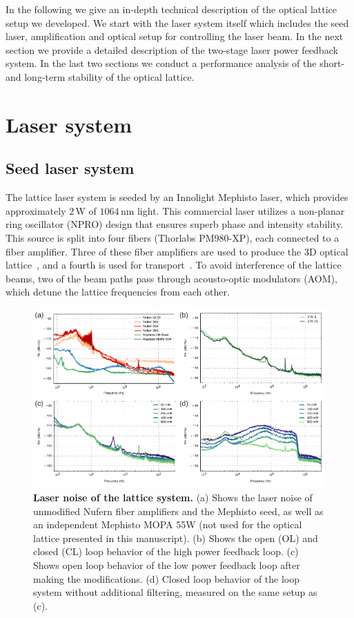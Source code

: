 \documentclass[twocolumn,aps,pra,showpacs,preprintnumbers,bibnotes]{revtex4-1}
\begin{document}
In the following we give an in-depth technical description of the optical lattice setup we developed. We start with the laser system itself which includes the seed laser, amplification and optical setup for controlling the laser beam. In the next section we provide a detailed description of the two-stage laser power feedback system. In the last two sections we conduct a performance analysis of the short- and long-term stability of the optical lattice.

\section{Laser system}
\subsection{Seed laser system}
The lattice laser system is seeded by an Innolight Mephisto laser, which provides approximately $2\,$W of $1064\,$nm light. 
This commercial laser utilizes a non-planar ring oscillator (NPRO) design that ensures superb phase and intensity stability. 
This source is split into four fibers (Thorlabs PM980-XP), each connected to a fiber amplifier. 
Three of these fiber amplifiers are used to produce the 3D optical lattice~\cite{Parsons2016}, and a fourth is used for transport~\cite{Huber2014}.
To avoid interference of the lattice beams, two of the beam paths pass through acousto-optic modulators (AOM), which detune the lattice frequencies from each other. 

\begin{figure}
  \begin{center}
    \includegraphics{fig/fig3_combined.pdf}
    \caption{\textbf{Laser noise of the lattice system.} (a) Shows the laser noise of unmodified Nufern fiber amplifiers and the Mephisto seed, as well as an independent Mephisto MOPA 55W (not used for the optical lattice presented in this manuscript). (b) Shows the open (OL) and closed (CL) loop behavior of the high power feedback loop. (c) Shows open loop behavior of the low power feedback loop after making the modifications. (d) Closed loop behavior of the loop system without additional filtering, measured on the same setup as (c).}\label{fig:noises}
  \end{center}
\end{figure}
\end{document}
